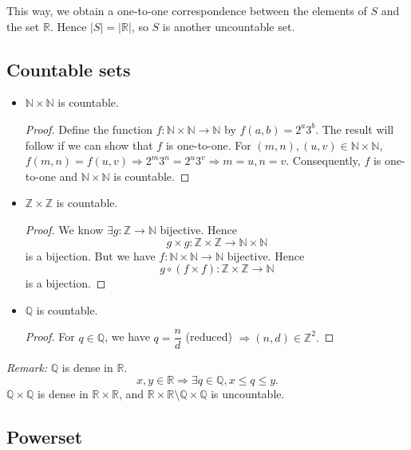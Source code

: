 \documentclass[11pt]{article}
\begin{document}
    This way, we obtain a one-to-one correspondence between the elements of $S$ and the set \(\mathbb{R}\). Hence \(|S| = |\mathbb{R}|\), so $S$ is another uncountable set.

   \subsection{Countable sets}

   \begin{itemize}
       \item \(\mathbb{N} \times \mathbb{N}\) is countable. 
       \begin{proof}
           Define the function \(f: \mathbb{N} \times \mathbb{N} \rightarrow \mathbb{N}\) by \(f(a,b) = 2^a 3^b.\) The result will follow if we can show that $f$ is one-to-one. For \((m,n),(u,v) \in \mathbb{N} \times \mathbb{N}\), \(f(m,n) = f(u,v) \Rightarrow 2^m 3^n = 2^u 3^v \Rightarrow m = u, n = v\). Consequently, $f$ is one-to-one and \(\mathbb{N} \times \mathbb{N}\) is countable. 
       \end{proof}

       \item \(\mathbb{Z} \times \mathbb{Z}\) is countable.
       \begin{proof}
           We know \(\exists g: \mathbb{Z} \rightarrow \mathbb{N}\) bijective. Hence \[g \times g: \mathbb{Z} \times \mathbb{Z} \rightarrow \mathbb{N} \times \mathbb{N}\] is a bijection. But we have \(f: \mathbb{N} \times \mathbb{N} \rightarrow \mathbb{N}\) bijective. Hence \[g \circ (f \times f) : \mathbb{Z} \times \mathbb{Z} \rightarrow \mathbb{N}\] is a bijection.
       \end{proof}

       \item \(\mathbb{Q}\) is countable.
        \begin{proof}
            For \(q \in \mathbb{Q}\), we have \(q = \dfrac{n}{d}\) (reduced) \(\Rightarrow (n,d) \in \mathbb{Z}^2.\)
        \end{proof}
   \end{itemize}

   \emph{Remark:} \(\mathbb{Q}\) is dense in \(\mathbb{R}\). \[x,y \in \mathbb{R} \Rightarrow \exists q \in \mathbb{Q}, x \leq q \leq y.\] \(\mathbb{Q} \times \mathbb{Q}\) is dense in \(\mathbb{R} \times \mathbb{R}\), and \(\mathbb{R} \times \mathbb{R} \setminus \mathbb{Q} \times \mathbb{Q}\) is uncountable.  


   \subsection{Powerset}
\end{document}
